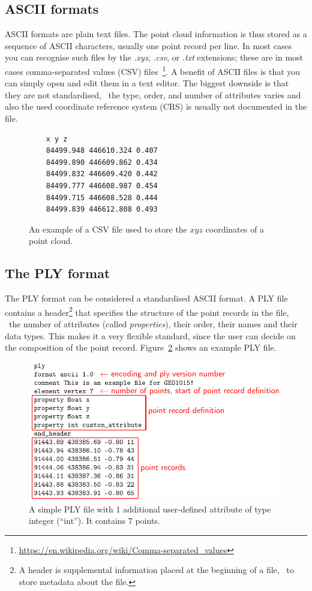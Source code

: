 \subsection{ASCII formats}
ASCII formats are plain text files. 
The point cloud information is thus stored as a sequence of ASCII characters, usually one point record per line.
In most cases you can recognise such files by the \emph{.xyz}, \emph{.csv}, or \emph{.txt} extensions; these are in most cases comma-separated values (CSV) files~\footnote{\url{https://en.wikipedia.org/wiki/Comma-separated_values}}.
A benefit of ASCII files is that you can simply open and edit them in a text editor.
The biggest downside is that they are not standardised, \ie\ the type, order, and number of attributes varies and also the used coordinate reference system (CRS) is usually not documented in the file.
\begin{figure}[h]
  \begin{lstlisting}
    x y z
    84499.948 446610.324 0.407
    84499.890 446609.862 0.434
    84499.832 446609.420 0.442
    84499.777 446608.987 0.454
    84499.715 446608.528 0.444
    84499.839 446612.808 0.493
  \end{lstlisting}
  \caption{An example of a CSV file used to store the $xyz$ coordinates of a point cloud.}
\label{fig:csv}
\end{figure}


\subsection{The PLY format}
The PLY format can be considered a standardised ASCII format.
A PLY file contains a header\footnote{A header is supplemental information placed at the beginning of a file, \eg\ to store metadata about the file.} that specifies the structure of the point records in the file, \ie\ the number of attributes (called \emph{properties}), their order, their names and their data types.
This makes it a very flexible standard, since the user can decide on the composition of the point record.
Figure~\ref{fig:ply} shows an example PLY file.
\begin{figure}
  \includegraphics[width=\linewidth]{figs/ply_header.pdf}
  \caption{A simple PLY file with 1 additional user-defined attribute of type integer (``int''). It contains 7 points.}
\label{fig:ply}
\end{figure}


